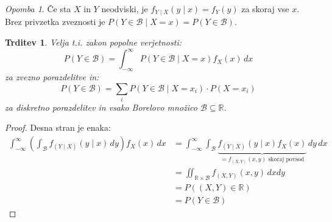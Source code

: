 \documentclass[12pt]{book}
\theoremstyle{definition}
\theoremstyle{plain}
\theoremstyle{plain}
\newtheorem{trditev}{Trditev}
\theoremstyle{plain}
\theoremstyle{plain}
\theoremstyle{remark}
\newtheorem*{opomba}{Opomba}
\begin{document}
\begin{opomba}
    Če sta $X$ in $Y$ neodviski, je $f_{Y\mid X}(y \mid x)= f_Y(y)$ za skoraj vse $x$. Brez privzetka zveznosti je $P(Y \in \mathcal{B} \mid X=x)=P(Y \in \mathcal{B})$. 
\end{opomba}

\begin{trditev}
    Velja t.i. zakon popolne verjetnosti:
    $$
    P(Y \in \mathcal{B})=\int_{-\infty}^{\infty} P(Y \in \mathcal{B} \mid X=x) f_X(x) \, d x
    $$
    za zvezno porazdelitve in:
    $$
    P(Y \in \mathcal{B})=\sum_i P\left(Y \in \mathcal{B} \mid X=x_i\right) \cdot P\left(X=x_i\right)
    $$
    za diskretno porazdelitev in vsako Borelovo množico $\mathcal{B} \subseteq \mathbb{R}$.
\end{trditev}

\newpage 

\begin{proof}
    Desna stran je enaka: 
    $$
    \begin{aligned}
        \int_{-\infty}^{\infty}\left(\int_{\mathcal{B}} f_{(Y \mid X)}(y \mid x) \,d y\right) f_X(x) \, d x &=\int_{-\infty}^{\infty} \int_{\mathcal{B}} \underbrace{f_{(Y \mid X)}(y \mid x) f_X(x)}_{=f_{(X,Y)}(x,y) \text{ skoraj povsod}} \, d y \, d x \\
        &=\iint_{\mathbb{R} \times \mathcal{B}} f_{(X, Y)}(x, y) \, d x d y \\
        &=P((X, Y) \in \mathbb{R}) \\
        &= P(Y \in \mathcal{B})
    \end{aligned}
    $$
\end{proof}
\end{document}
